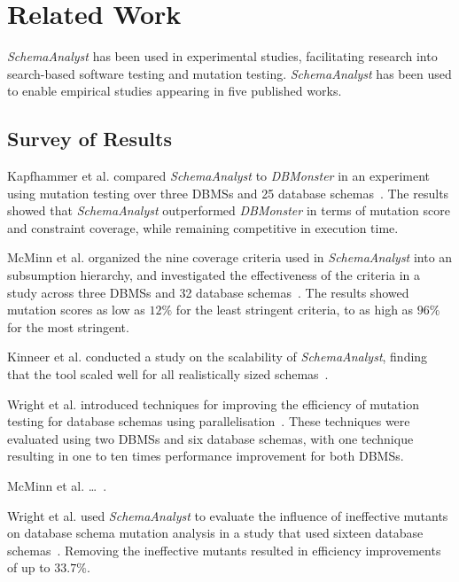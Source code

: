 

\section{Related Work}\label{sec:relatedwork}



\textit{SchemaAnalyst} has been used in experimental studies, facilitating research into
search-based software testing and mutation testing.  \textit{SchemaAnalyst} has been used to enable
empirical studies appearing in five published works. 
\subsection{Survey of Results}

Kapfhammer et al. compared \textit{SchemaAnalyst} to \textit{DBMonster}
in an experiment using mutation testing over three DBMSs and 25 database 
schemas~\cite{kapfhammer2013search}. The results showed that \textit{SchemaAnalyst} outperformed
\textit{DBMonster} in terms of mutation score and constraint coverage, while remaining competitive
in execution time.

McMinn et al. organized the nine coverage criteria used in \textit{SchemaAnalyst} into an subsumption
hierarchy, and investigated the effectiveness of the criteria in a study across
three DBMSs and 32 database schemas~\cite{mcminn2015effectiveness}.  The results showed mutation
scores as low as $12\%$ for the least stringent criteria, to as high as $96\%$ for the most stringent.

Kinneer et al. conducted a study on the scalability of \textit{SchemaAnalyst}, finding that the tool
scaled well for all realistically sized schemas~\cite{kinneer2015automatically}.

Wright et al. introduced techniques for improving the efficiency of mutation testing for database
schemas using parallelisation~\cite{wright2013efficient}. These techniques were evaluated using two
DBMSs and six database schemas, with one technique resulting in one to ten times performance
improvement for both DBMSs.

McMinn et al. \dots~\cite{mcminn2016virtual}.

Wright et al. used \textit{SchemaAnalyst} to evaluate the influence of ineffective mutants on
database schema mutation analysis in a study that used sixteen database
schemas~\cite{wright2014impact}. Removing the ineffective mutants resulted in efficiency
improvements of up to $33.7\%$.

